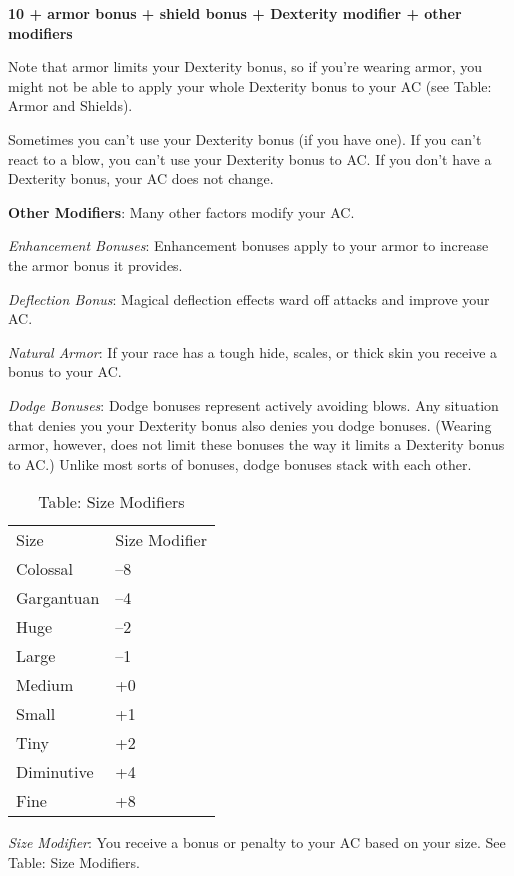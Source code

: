 {\large \textbf{10 + armor bonus + shield bonus + Dexterity modifier + other modifiers}}
				
Note that armor limits your Dexterity bonus, so if you're wearing armor, you might not be able to apply your whole Dexterity bonus to your AC (see Table: Armor and Shields).
				
Sometimes you can't use your Dexterity bonus (if you have one). If you can't react to a blow, you can't use your Dexterity bonus to AC. If you don't have a Dexterity bonus, your AC does not change.
				
\textbf{Other Modifiers}: Many other factors modify your AC.
				
\textit{Enhancement Bonuses}: Enhancement bonuses apply to your armor to increase the armor bonus it provides.
				
\textit{Deflection Bonus}: Magical deflection effects ward off attacks and improve your AC.
				
\textit{Natural Armor}: If your race has a tough hide, scales, or thick skin you receive a bonus to your AC.
				
\textit{Dodge Bonuses}: Dodge bonuses represent actively avoiding blows. Any situation that denies you your Dexterity bonus also denies you dodge bonuses. (Wearing armor, however, does not limit these bonuses the way it limits a Dexterity bonus to AC.) Unlike most sorts of bonuses, dodge bonuses stack with each other.
\begin{table}[]
\sffamily
\caption{Table: Size Modifiers}
\begin{tabular}{ll}
Size & Size Modifier\\
Colossal & –8 \\
 Gargantuan & –4 \\
 Huge & –2 \\
 Large & –1 \\
 Medium & +0 \\
 Small & +1 \\
 Tiny & +2 \\
 Diminutive & +4 \\
 Fine & +8\\
\end{tabular}
\end{table}

				
\textit{Size Modifier}: You receive a bonus or penalty to your AC based on your size. See Table: Size Modifiers.
				

